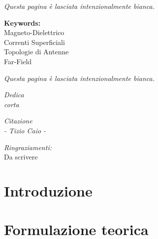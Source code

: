 \documentclass[12pt,a4paper]{book}
\newcommand{\intentblankpage}{
    \newpage
    \null
    \vfill
    \thispagestyle{empty}
    \begin{center}
        \textit{Questa pagina \`e lasciata intenzionalmente bianca.}
    \end{center}
    \newpage
}
\newlength{\sixtyfivecharwidth}
\begin{document}
    
    \intentblankpage
    
    \vspace*{50mm}
    \begin{flushright}
        {\Large{\bf Keywords:}\\ \vspace{5mm}
            Magneto-Dielettrico\\ \vspace{2mm}
            Correnti Superficiali\\ \vspace{2mm}
            Topologie di Antenne\\ \vspace{2mm}
            Far-Field\\
        }
    \end{flushright}
    
    \intentblankpage
    
    \vspace*{50mm}
    \begin{flushright}
        \textit{\large Dedica \\ corta}
    \end{flushright}
    
    \newpage
    
    \vspace*{30mm}
    \begin{flushright}
        \textit{\large Citazione 
            \\ \vspace{5mm}  - Tizio Caio -}
    \end{flushright}
    
    \vfill
    
    \noindent \hspace{20mm} \textit{\large{Ringraziamenti:}} \vspace{5mm}\\
    Da scrivere
    
    \newpage
    \tableofcontents
    
    \chapter{Introduzione} 
    \label{CH:Intro}
    
    
    \chapter{Formulazione teorica}
    \label{CH:Teoria}
    
    
\end{document}
